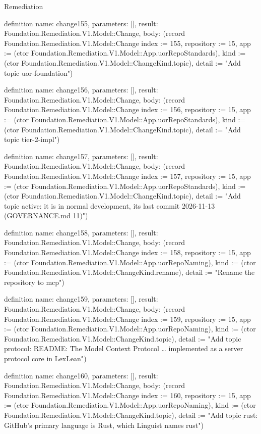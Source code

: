 \begin{lexlean}{Remediation}
\begin{semanticmodule}
definition{
  name: change155,
  parameters: [],
  result: Foundation.Remediation.V1.Model::Change,
  body: (record Foundation.Remediation.V1.Model::Change {index := 155, repository := 15, app := (ctor Foundation.Remediation.V1.Model::App.uorRepoStandards), kind := (ctor Foundation.Remediation.V1.Model::ChangeKind.topic), detail := "Add topic uor-foundation"})
}

definition{
  name: change156,
  parameters: [],
  result: Foundation.Remediation.V1.Model::Change,
  body: (record Foundation.Remediation.V1.Model::Change {index := 156, repository := 15, app := (ctor Foundation.Remediation.V1.Model::App.uorRepoStandards), kind := (ctor Foundation.Remediation.V1.Model::ChangeKind.topic), detail := "Add topic tier-2-impl"})
}

definition{
  name: change157,
  parameters: [],
  result: Foundation.Remediation.V1.Model::Change,
  body: (record Foundation.Remediation.V1.Model::Change {index := 157, repository := 15, app := (ctor Foundation.Remediation.V1.Model::App.uorRepoStandards), kind := (ctor Foundation.Remediation.V1.Model::ChangeKind.topic), detail := "Add topic active: it is in normal development, its last commit 2026-11-13 (GOVERNANCE.md 11)"})
}

definition{
  name: change158,
  parameters: [],
  result: Foundation.Remediation.V1.Model::Change,
  body: (record Foundation.Remediation.V1.Model::Change {index := 158, repository := 15, app := (ctor Foundation.Remediation.V1.Model::App.uorRepoNaming), kind := (ctor Foundation.Remediation.V1.Model::ChangeKind.rename), detail := "Rename the repository to mcp"})
}

definition{
  name: change159,
  parameters: [],
  result: Foundation.Remediation.V1.Model::Change,
  body: (record Foundation.Remediation.V1.Model::Change {index := 159, repository := 15, app := (ctor Foundation.Remediation.V1.Model::App.uorRepoNaming), kind := (ctor Foundation.Remediation.V1.Model::ChangeKind.topic), detail := "Add topic protocol: README: \"The Model Context Protocol … implemented as a server protocol core in LexLean\""})
}

definition{
  name: change160,
  parameters: [],
  result: Foundation.Remediation.V1.Model::Change,
  body: (record Foundation.Remediation.V1.Model::Change {index := 160, repository := 15, app := (ctor Foundation.Remediation.V1.Model::App.uorRepoNaming), kind := (ctor Foundation.Remediation.V1.Model::ChangeKind.topic), detail := "Add topic rust: GitHub's primary language is Rust, which Linguist names rust"})
}


\end{semanticmodule}
\end{lexlean}
